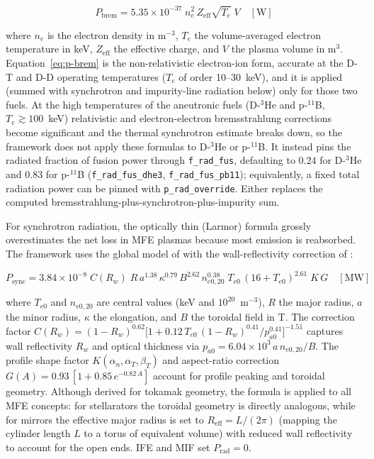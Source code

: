 \documentclass{article}
\begin{document}
\begin{equation}
\label{eq:p-brem}
P_{\text{brem}} = 5.35 \times 10^{-37}\; n_e^2 \, Z_{\text{eff}}
  \sqrt{T_e}\; V \quad [\text{W}]
\end{equation}

\noindent where $n_e$ is the electron density in m$^{-3}$, $T_e$ the
volume-averaged electron temperature in keV, $Z_{\text{eff}}$ the
effective charge, and $V$ the plasma volume in m$^3$.
Equation~\eqref{eq:p-brem} is the non-relativistic electron-ion form,
accurate at the D-T and D-D operating temperatures
($T_e$ of order 10--$30$~keV), and it is applied (summed with synchrotron and
impurity-line radiation below) only for those two fuels. At the high
temperatures of the aneutronic fuels (D-${}^3$He and p-${}^{11}$B,
$T_e \gtrsim 100$~keV) relativistic and electron-electron bremsstrahlung
corrections become significant and the thermal synchrotron estimate breaks
down, so the framework does not apply these formulas to D-${}^3$He or
p-${}^{11}$B. It instead pins the radiated fraction of fusion power through
\texttt{f\_rad\_fus}, defaulting to $0.24$ for D-${}^3$He
\citep{rider1997} and $0.83$ for p-${}^{11}$B \citep{ochs2022}
(\texttt{f\_rad\_fus\_dhe3}, \texttt{f\_rad\_fus\_pb11});
equivalently, a fixed total radiation power can be pinned with
\texttt{p\_rad\_override}. Either replaces the computed
bremsstrahlung-plus-synchrotron-plus-impurity sum.

For synchrotron radiation, the optically thin (Larmor) formula
grossly overestimates the net loss in MFE plasmas because most
emission is reabsorbed. The framework uses the global model of
\citet{albajar2001} with the wall-reflectivity correction of
\citet{fidone2001}:

\begin{equation}
\label{eq:p-sync}
P_{\text{sync}} = 3.84 \times 10^{-8}\;
  C(R_w)\; R\, a^{1.38}\, \kappa^{0.79}\, B^{2.62}\,
  n_{e0,20}^{0.38}\; T_{e0}\,(16 + T_{e0})^{2.61}\;
  K\, G
  \quad [\text{MW}]
\end{equation}

\noindent where $T_{e0}$ and $n_{e0,20}$ are central values (keV
and $10^{20}$~m$^{-3}$), $R$ the major radius, $a$ the minor
radius, $\kappa$ the elongation, and $B$ the toroidal field in T.
The correction factor
$C(R_w) = (1-R_w)^{0.62}\bigl[1 + 0.12\,T_{e0}\,(1-R_w)^{0.41}/
p_{a0}^{0.41}\bigr]^{-1.51}$
captures wall reflectivity $R_w$ and optical thickness via
$p_{a0} = 6.04 \times 10^3\, a\, n_{e0,20}/B$.
The profile shape factor $K(\alpha_n, \alpha_T, \beta_T)$ and
aspect-ratio correction $G(A) = 0.93\,[1 + 0.85\,e^{-0.82\,A}]$
account for profile peaking and toroidal geometry.
Although derived for tokamak geometry, the formula is applied to all
MFE concepts: for stellarators the toroidal geometry is directly
analogous, while for mirrors the effective major radius is set to
$R_{\text{eff}} = L/(2\pi)$ (mapping the cylinder length $L$ to a
torus of equivalent volume) with reduced wall reflectivity to account
for the open ends. IFE and MIF set $P_{\text{rad}} = 0$.
\end{document}
